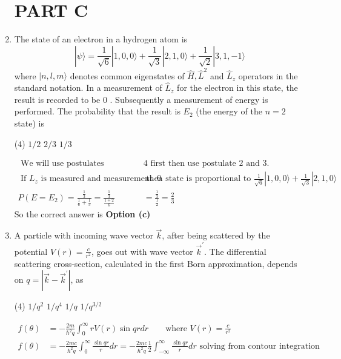 \begin{enumerate}
\section{PART C}
\item  The state of an electron in a hydrogen atom is
$$
|\psi\rangle=\frac{1}{\sqrt{6}}|1,0,0\rangle+\frac{1}{\sqrt{3}}|2,1,0\rangle+\frac{1}{\sqrt{2}}|3,1,-1\rangle
$$
where $|n, l, m\rangle$ denotes common eigenstates of $\hat{H}, \hat{L}^{2}$ and $\hat{L}_{z}$ operators in the standard notation.
In a measurement of $\hat{L}_{z}$ for the electron in this state, the result is recorded to be 0 . Subsequently a measurement of energy is performed. The probability that the result is $E_{2}$ (the energy of the $n=2$ state) is
 \begin{tasks}(4)
	\task[\textbf{b.}] $1 / 2$
	\task[\textbf{c.}] $2 / 3$
	\task[\textbf{d.}] $1 / 3$
\end{tasks}
\begin{answer}
	\begin{align*}
	\text { We will use postulates } &4 \text { first then use postulate } 2 \text { and } 3 \text {. }\\
	\text { If } L_{z} \text { is measured and measurement is } 0& \text { then state is proportional to } \frac{1}{\sqrt{6}}|1,0,0\rangle+\frac{1}{\sqrt{3}}|2,1,0\rangle\\
	P\left(E=E_{2}\right)=\frac{\frac{1}{3}}{\frac{1}{6}+\frac{1}{3}}=\frac{\frac{1}{3}}{\frac{1+2}{6}}&=\frac{\frac{1}{3}}{\frac{1}{2}}=\frac{2}{3}
	\end{align*}
	So the correct answer is \textbf{Option (c)}
\end{answer}
\item  A particle with incoming wave vector $\vec{k}$, after being scattered by the potential $V(r)=\frac{c}{r^{2}}$, goes out with wave vector $\vec{k}^{\prime}$. The differential scattering cross-section, calculated in the first Born approximation, depends on $q=\left|\vec{k}-\vec{k}^{\prime}\right|$, as
 \begin{tasks}(4)
	\task[\textbf{a.}]$1 / q^{2}$
	\task[\textbf{b.}]$1 / q^{4}$
	\task[\textbf{c.}]$1 / q$
	\task[\textbf{d.}] $1 / q^{3 / 2}$
\end{tasks}
\begin{answer}
	\begin{align*}
	f(\theta)&=-\frac{2 m}{\hbar^{2} q} \int_{0}^{\infty} r V(r) \sin q r d r\qquad
	\text{where }V(r)=\frac{c}{r^{2}}\\
	f(\theta)&=-\frac{2 m c}{\hbar^{2} q} \int_{0}^{\infty} \frac{\sin q r}{r} d r=-\frac{2 m c}{\hbar^{2} q} \frac{1}{2} \int_{-\infty}^{\infty} \frac{\sin q r}{r} d r\text{ solving from contour integration}\\

\end{align*}
\end{answer}
\end{enumerate}
